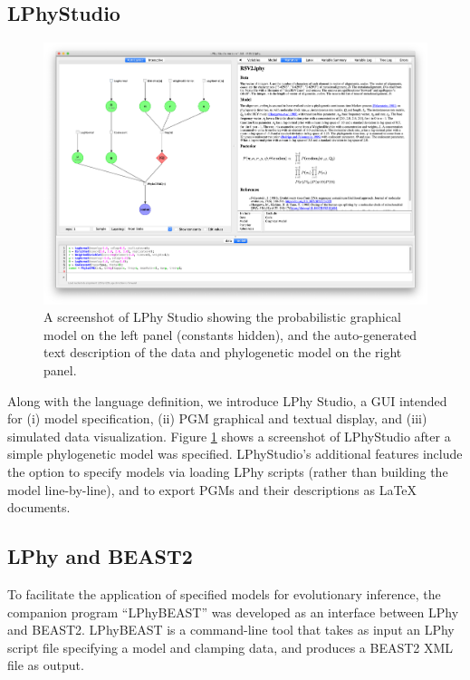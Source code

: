 \documentclass[10pt,letterpaper,table]{article}
\begin{document}
\subsection{LPhyStudio} 
\begin{figure}[!h]
  \includegraphics[width=\textwidth]{figs/lphystudio_screenshot.png}
  \caption{A screenshot of LPhy Studio showing the probabilistic graphical model 
  on the left panel (constants hidden), and the auto-generated text description of the data and phylogenetic model on the right panel.} 
  \label{fig:lphystudio}
\end{figure}
Along with the language definition, we introduce LPhy Studio, a GUI intended for (i) model specification, (ii) PGM graphical and textual display, and (iii) simulated data visualization.
Figure \ref{fig:lphystudio} shows a screenshot of LPhyStudio after a simple phylogenetic model was specified. LPhyStudio's additional features include the option to specify models via loading LPhy scripts (rather than building the model line-by-line), and to export PGMs and their descriptions as LaTeX documents.

\subsection{LPhy and BEAST2}
\label{sec:lphybeast}
To facilitate the application of specified models for evolutionary inference, the companion program ``LPhyBEAST'' was developed as an interface between LPhy and BEAST2.
LPhyBEAST is a command-line tool that takes as input an LPhy script file specifying a model and clamping data, and produces a BEAST2 XML file as output.
\end{document}
